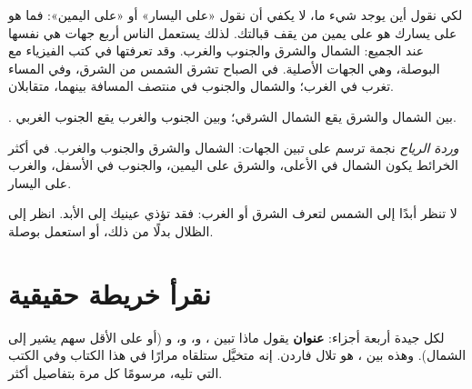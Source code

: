 لكي نقول أين يوجد شيء ما، لا يكفي أن نقول «على اليسار» أو «على اليمين»:
فما هو على يسارك هو على يمين من يقف قبالتك. لذلك يستعمل الناس أربع
جهات هي نفسها عند الجميع: الشمال والشرق والجنوب والغرب. وقد تعرفتها في
كتب الفيزياء مع البوصلة، وهي الجهات الأصلية. في الصباح تشرق الشمس من
الشرق، وفي المساء تغرب في الغرب؛ والشمال والجنوب في منتصف المسافة
بينهما، متقابلان.

\begin{omfigure}

{\small {}. بين الشمال والشرق يقع الشمال الشرقي؛ وبين الجنوب
والغرب يقع الجنوب الغربي.}
\label{fig:g2:drawing-to-map:rose}
\end{omfigure}

\begin{definition}\label{def:g2:drawing-to-map:directions}
\emph{وردة الرياح} نجمة ترسم على  تبين
الجهات: الشمال والشرق والجنوب والغرب. في أكثر الخرائط يكون الشمال في
الأعلى، والشرق على اليمين، والجنوب في الأسفل، والغرب على اليسار.
\end{definition}

\begin{safety}
لا تنظر أبدًا إلى الشمس لتعرف الشرق أو الغرب: فقد تؤذي عينيك إلى الأبد.
انظر إلى الظلال بدلًا من ذلك، أو استعمل بوصلة.
\end{safety}

\section{نقرأ خريطة حقيقية}

لكل  جيدة أربعة أجزاء: \textbf{عنوان} يقول ماذا تبين ،
و\textbf{}، و\textbf{}، و\textbf{}
(أو على الأقل سهم يشير إلى الشمال). وهذه   بين ، هو
تلال فاردن. إنه  متخيَّل ستلقاه مرارًا في هذا الكتاب وفي الكتب التي
تليه، مرسومًا كل مرة بتفاصيل أكثر.

